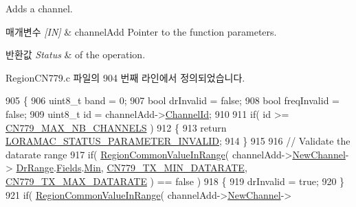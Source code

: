 Adds a channel. 


\begin{DoxyParams}{매개변수}
{\em \mbox{[}\+I\+N\mbox{]}} & channel\+Add Pointer to the function parameters.\\
\hline
\end{DoxyParams}

\begin{DoxyRetVals}{반환값}
{\em Status} & of the operation. \\
\hline
\end{DoxyRetVals}


Region\+C\+N779.\+c 파일의 904 번째 라인에서 정의되었습니다.


\begin{DoxyCode}
905 \{
906     uint8\_t band = 0;
907     \textcolor{keywordtype}{bool} drInvalid = \textcolor{keyword}{false};
908     \textcolor{keywordtype}{bool} freqInvalid = \textcolor{keyword}{false};
909     uint8\_t \textcolor{keywordtype}{id} = channelAdd->\mbox{\hyperlink{structs_channel_add_params_ae23f953dc29c360e56a3c856404a3276}{ChannelId}};
910 
911     \textcolor{keywordflow}{if}( \textcolor{keywordtype}{id} >= \mbox{\hyperlink{group___r_e_g_i_o_n_c_n779_gaa23230e648a8147840e88f03f9d3b7fc}{CN779\_MAX\_NB\_CHANNELS}} )
912     \{
913         \textcolor{keywordflow}{return} \mbox{\hyperlink{group___l_o_r_a_m_a_c_gga1d18f26b344040b3ec5c3db662919661ad0d3119f247d00e1787dda106fcb3017}{LORAMAC\_STATUS\_PARAMETER\_INVALID}};
914     \}
915 
916     \textcolor{comment}{// Validate the datarate range}
917     \textcolor{keywordflow}{if}( \mbox{\hyperlink{group___r_e_g_i_o_n_c_o_m_m_o_n_gafdd1c80d953e18d755a631b72a9c3bd3}{RegionCommonValueInRange}}( channelAdd->\mbox{\hyperlink{structs_channel_add_params_afc31493a105479490228fd896b20b45c}{NewChannel}}->
      \mbox{\hyperlink{structs_channel_params_ad4d9b041ea740886a05fa8a1d06997a2}{DrRange}}.\mbox{\hyperlink{unionu_dr_range_a5bdb9afc17112f2ae5f9548f0aee964f}{Fields}}.\mbox{\hyperlink{structu_dr_range_1_1s_fields_ad870086364c5eb410eec40e1025e3203}{Min}}, \mbox{\hyperlink{group___r_e_g_i_o_n_c_n779_ga78e9e4ce4dd6df844573865d9de7e268}{CN779\_TX\_MIN\_DATARATE}}, 
      \mbox{\hyperlink{group___r_e_g_i_o_n_c_n779_gabc1992b9207de536e7b92f2d51e6b7e4}{CN779\_TX\_MAX\_DATARATE}} ) == \textcolor{keyword}{false} )
918     \{
919         drInvalid = \textcolor{keyword}{true};
920     \}
921     \textcolor{keywordflow}{if}( \mbox{\hyperlink{group___r_e_g_i_o_n_c_o_m_m_o_n_gafdd1c80d953e18d755a631b72a9c3bd3}{RegionCommonValueInRange}}( channelAdd->\mbox{\hyperlink{structs_channel_add_params_afc31493a105479490228fd896b20b45c}{NewChannel}}->

\end{DoxyCode}

